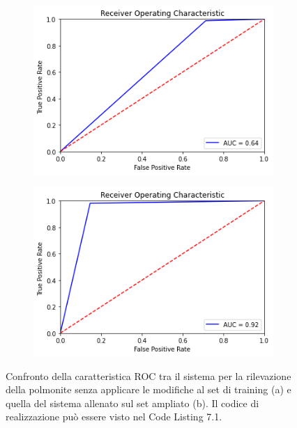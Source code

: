 \begin{figure}[hb!]
  \begin{subfigure}{0.5\textwidth}
    \centering
    \includegraphics[width=1\textwidth]{Figures/roc-pneumonia-no-aug.png}
    \caption{}
    \label{fig:snap1}
  \end{subfigure}%
  \begin{subfigure}{0.5\textwidth}
    \centering
    \includegraphics[width=1\textwidth]{Figures/roc-pneumonia-aug.png}
    \caption{}
    \label{fig:snap2}
  \end{subfigure}%
  \caption{Confronto della caratteristica ROC tra il sistema per la rilevazione della polmonite senza applicare le modifiche al set di training (a)
  e quella del sistema allenato sul set ampliato (b). Il codice di realizzazione può essere visto nel Code Listing 7.1.
  }
  \label{fig:fig}
\end{figure} 



